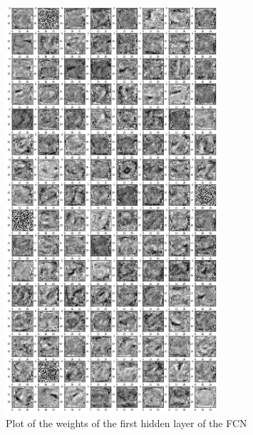 \documentclass[a4paper, 11pt]{article}
\begin{document}
\begin{appendices}
    \begin{figure}[H]
      \centering
      \includegraphics[width=0.7\textwidth]{img/classification/FCN_weights.png}
      \caption{Plot of the weights of the first hidden layer of the FCN}
      \label{fig:c:FCN_w}
    \end{figure}

\end{appendices}
\end{document}
